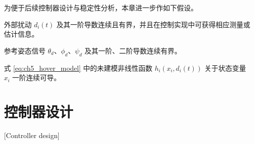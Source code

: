 为便于后续控制器设计与稳定性分析，本章进一步作如下假设。

\begin{assumption}\label{assump:ch5_disturbance}
外部扰动 $d_i(t)$ 及其一阶导数连续且有界，并且在控制实现中可获得相应测量或估计信息。
\end{assumption}

\begin{assumption}\label{assump:ch5_reference}
参考姿态信号 $\theta_d$、$\phi_d$、$\psi_d$ 及其一阶、二阶导数连续有界。
\end{assumption}

\begin{assumption}\label{assump:ch5_nonlinear}
式 \eqref{eq:ch5_hover_model} 中的未建模非线性函数 $h_i(x_i,d_i(t))$ 关于状态变量 $x_i$ 一阶连续可导。
\end{assumption}

\section{控制器设计}[Controller design]

